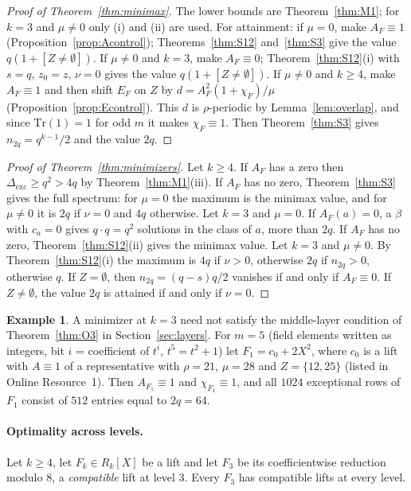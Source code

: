 \documentclass[11pt]{article}
\theoremstyle{definition}
\newtheorem{example}[theorem]{Example}
\theoremstyle{remark}
\newcommand{\Tr}{\mathrm{Tr}}
\newcommand{\Dexc}{\Delta_{\mathrm{exc}}}
\begin{document}
\begin{proof}[Proof of Theorem~\ref{thm:minimax}]
The lower bounds are Theorem~\ref{thm:M1}; for $k=3$ and $\mu\ne0$ only (i) and (ii) are used. For attainment:
if $\mu=0$, make $A_F\equiv1$ (Proposition~\ref{prop:Acontrol}); Theorems~\ref{thm:S12} and~\ref{thm:S3} give
the value $q(1+[Z\ne\emptyset])$. If $\mu\ne0$ and $k=3$, make $A_F\equiv0$; Theorem~\ref{thm:S12}(i) with
$s=q$, $z_0=z$, $\nu=0$ gives the value $q(1+[Z\ne\emptyset])$. If $\mu\ne0$ and $k\ge4$, make $A_F\equiv1$ and
then shift $E_F$ on $Z$ by $d=A_F^2(1+\chi_F)/\mu$ (Proposition~\ref{prop:Econtrol}). This $d$ is
$\rho$-periodic by Lemma~\ref{lem:overlap}, and since $\Tr(1)=1$ for odd $m$ it makes $\chi_F\equiv1$. Then
Theorem~\ref{thm:S3} gives $n_{2q}=q^{k-1}/2$ and the value $2q$.
\end{proof}

\begin{proof}[Proof of Theorem~\ref{thm:minimizers}]
Let $k\ge4$. If $A_F$ has a zero then $\Dexc\ge q^2>4q$ by Theorem~\ref{thm:M1}(iii). If $A_F$ has no zero,
Theorem~\ref{thm:S3} gives the full spectrum: for $\mu=0$ the maximum is the minimax value, and for $\mu\ne0$
it is $2q$ if $\nu=0$ and $4q$ otherwise.
Let $k=3$ and $\mu=0$. If $A_F(a)=0$, a $\beta$ with $c_a=0$ gives $q\cdot q=q^2$ solutions in the class of
$a$, more than $2q$. If $A_F$ has no zero, Theorem~\ref{thm:S12}(ii) gives the minimax value.
Let $k=3$ and $\mu\ne0$. By Theorem~\ref{thm:S12}(i) the maximum is $4q$ if $\nu>0$, otherwise $2q$ if
$n_{2q}>0$, otherwise $q$. If $Z=\emptyset$, then $n_{2q}=(q-s)q/2$ vanishes if and only if $A_F\equiv0$. If
$Z\ne\emptyset$, the value $2q$ is attained if and only if $\nu=0$.
\end{proof}

\begin{example}
A minimizer at $k=3$ need not satisfy the middle-layer condition of Theorem~\ref{thm:O3} in Section~\ref{sec:layers}.
For $m=5$ (field elements written as integers, bit $i$ = coefficient of $t^i$, $t^5=t^2+1$) let
$F_1=c_0+2X^2$, where $c_0$ is a lift with $A\equiv1$ of a representative with $\rho=21$, $\mu=28$ and
$Z=\{12,25\}$ (listed in Online Resource~1). Then $A_{F_1}\equiv1$ and $\chi_{F_1}\equiv1$, and all $1024$ exceptional
rows of $F_1$ consist of $512$ entries equal to $2q=64$.
\end{example}

\paragraph{Optimality across levels.}
Let $k\ge4$, let $F_k\in R_k[X]$ be a lift and let $F_3$ be its coefficientwise reduction modulo $8$, a
\emph{compatible} lift at level $3$. Every $F_3$ has compatible lifts at every level.
\end{document}
